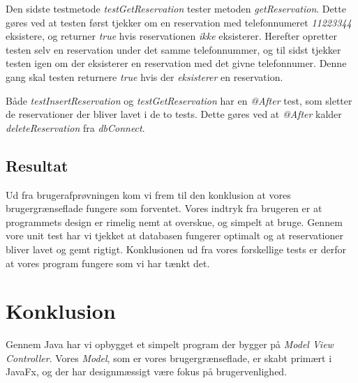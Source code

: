 \documentclass[final]{report}
\begin{document}
Den sidste testmetode \emph{testGetReservation} tester metoden \emph{getReservation}. Dette gøres ved at testen først tjekker om en reservation med telefonnumeret \emph{11223344} eksistere, og returner \emph{true} hvis reservationen \emph{ikke} eksisterer. Herefter opretter testen selv en reservation under det samme telefonnummer, og til sidst tjekker testen igen om der eksisterer en reservation med det givne telefonnumer. Denne gang skal testen returnere \emph{true} hvis der \emph{eksisterer} en reservation. 

Både \emph{testInsertReservation} og \emph{testGetReservation} har en \emph{@After} test, som sletter de reservationer der bliver lavet i de to tests. Dette gøres ved at \emph{@After} kalder \emph{deleteReservation} fra \emph{dbConnect}.


\section{Resultat}
Ud fra brugerafprøvningen kom vi frem til den konklusion at vores brugergrænseflade fungere som forventet. Vores indtryk fra brugeren er at programmets design er rimelig nemt at overskue, og simpelt at bruge. Gennem vore unit test har vi tjekket at databasen fungerer optimalt og at reservationer bliver lavet og gemt rigtigt. Konklusionen ud fra vores forskellige tests er derfor at vores program fungere som vi har tænkt det. 

\chapter{Konklusion}
Gennem Java har vi opbygget et simpelt program der bygger på \emph{Model View Controller}. Vores \emph{Model}, som er vores brugergrænseflade, er skabt primært i JavaFx, og der har designmæssigt \cite{oracle} være fokus på \cite{Java} brugervenlighed\cite{video}. 

\printbibliography

\listoffigures
\end{document}
